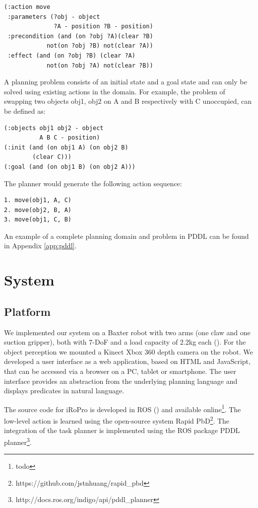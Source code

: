 \begin{verbatim}
(:action move
 :parameters (?obj - object 
              ?A - position ?B - position)
 :precondition (and (on ?obj ?A)(clear ?B)
            not(on ?obj ?B) not(clear ?A))
 :effect (and (on ?obj ?B) (clear ?A)
            not(on ?obj ?A) not(clear ?B))
\end{verbatim}

A planning problem consists of an initial state and a goal state and can only be solved using existing actions in the domain.
For example, the problem of swapping two objects obj1, obj2 on A and B respectively with C unoccupied, can be defined as:
\begin{verbatim}
(:objects obj1 obj2 - object
          A B C - position)
(:init (and (on obj1 A) (on obj2 B) 
        (clear C)))
(:goal (and (on obj1 B) (on obj2 A)))
\end{verbatim}
The planner would generate the following action sequence:
\begin{verbatim}
1. move(obj1, A, C)
2. move(obj2, B, A)
3. move(obj1, C, B)
\end{verbatim}
An example of a complete planning domain and problem in PDDL can be found in Appendix \ref{app:pddl}.


\section{System}
\label{sec:system}
\subsection{Platform}
\label{sec:platform}
We implemented our system on a Baxter robot with two arms (one claw and one suction gripper), both with 7-DoF and a load capacity of 2.2kg each ().
For the object perception we mounted a Kinect Xbox 360 depth camera on the robot.
We developed a user interface as a web application, based on HTML and JavaScript, that can be accessed via a browser on a PC, tablet or smartphone.
The user interface provides an abstraction from the underlying planning language and displays predicates in natural language.

The source code for iRoPro is developed in ROS (\cite{quigley2009ros}) and available online\footnote{todo}. %
The low-level action is learned using the open-source system Rapid PbD\footnote{https://github.com/jstnhuang/rapid_pbd}.
The integration of the task planner is implemented using the ROS package PDDL planner\footnote{http://docs.ros.org/indigo/api/pddl_planner}.

